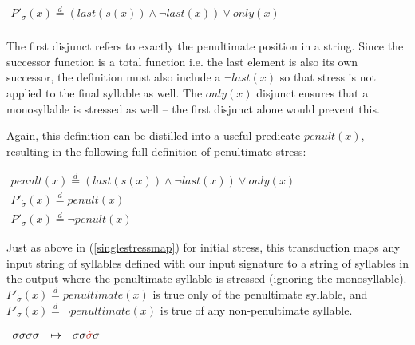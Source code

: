 \documentclass[12pt]{article}
\newcommand{\sig}{\sigma}
\newcommand{\deq}{\stackrel{d}{=}}
\newcommand{\ass}{\acute{\sig}}
\newcommand{\brass}{{\color{BrickRed}{\ass}}}
\begin{document}
\begin{exe}
\item $\begin{array}{l}
   P'_\ass(x) \deq  (last(s(x)) \land \neg last(x)) \lor only(x)  \\
     
\end{array} $
\label{penultdef}
\end{exe}
 	
\noindent 
The first disjunct refers to exactly the penultimate position in a string. Since the successor function is a total function i.e. the last element is also its own successor, the definition must also include a $\neg last(x)$ so that stress is not applied to the final syllable as well. The $only(x)$ disjunct ensures that a monosyllable is stressed as well -- the first disjunct alone would prevent this.

Again, this definition can be distilled into a useful predicate $penult(x)$, resulting in the following full definition of penultimate stress:

\begin{exe}
\item $\begin{array}{l}
   penult(x) \deq  (last(s(x)) \land \neg last(x)) \lor only(x)  \\
   P'_\ass(x) \deq penult(x)\\
   P'_\sig(x) \deq  \neg penult(x)  
     
\end{array} $
\label{penultpred}
\end{exe}

\noindent
Just as above in (\ref{singlestressmap}) for initial stress, this transduction maps any input string of syllables defined with our input signature to a string of syllables in the output where the penultimate syllable is stressed (ignoring the monosyllable). $P'_\ass(x) \deq penultimate(x)$ is true only of the penultimate syllable, and $P'_\sig(x) \deq \neg penultimate(x)$ is true of any non-penultimate syllable. 

\begin{exe}

\item 
$\begin{array}[t]{lll}
  	\sig\sig\sig\sig                 & \mapsto & \sig\sig\brass\sig                 \\
 	\end{array}$
 	\label{penultstressmap}
\end{exe}
\end{document}
